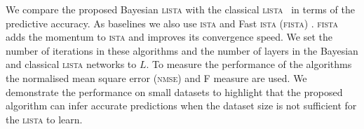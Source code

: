 \documentclass{article}
\begin{document}
We compare the proposed Bayesian \textsc{lista} with the classical \textsc{lista}~\citep{gregor2010learning} in terms of the predictive accuracy. As baselines we also use \textsc{ista} \citep{daubechies2004iterative} and Fast \textsc{ista} (\textsc{fista}) \citep{beck2009fast}. \textsc{fista} adds the momentum to \textsc{ista} and improves its convergence speed. We set the number of iterations in these algorithms and the number of layers in the Bayesian and classical \textsc{lista} networks to $L$. To measure the performance of the algorithms the normalised mean square error (\textsc{nmse}) and F measure are used. We demonstrate the performance on small datasets to highlight that the proposed algorithm can infer accurate predictions when the dataset size is not sufficient for the \textsc{lista} to learn.

\begin{figure}[t!]
\centering
\\[-13pt]
\end{figure}
\end{document}
